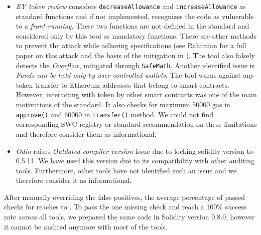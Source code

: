 \begin{itemize}[noitemsep,topsep=0pt]
	\item \textit{EY token review} considers \texttt{decreaseAllowance} and \texttt{increaseAllowance} as standard \erc functions and if not implemented, recognizes the code as vulnerable to a \textit{front-running}. These two functions are not defined in the \erc standard\cite{ERC20Std} and considered only by this tool as mandatory functions. There are other methods to prevent the attack while adhering \erc specifications (see Rahimian \etal for a full paper on this attack and the basis of the mitigation in \sys\cite{ERC20MWA}). The tool also falsely detects the \textit{Overflow}, mitigated through \texttt{SafeMath}. Another identified issue is \textit{Funds can be held only by user-controlled wallets}. The tool warns against any token transfer to Ethereum addresses that belong to smart contracts. However, interacting with \erc token by other smart contracts was one of the main motivations of the standard. It also checks for maximum 50000 gas in \texttt{approve()} and 60000 in \texttt{transfer()} method. We could not find corresponding SWC registry or standard recommendation on these limitations and therefore consider them as informational.

	\item \textit{Odin} raises \textit{Outdated compiler version} issue due to locking solidity version to 0.5.11. We have used this version due to its compatibility with other auditing tools. Furthermore, other tools have not identified such an issue and we therefore consider it as informational.
\end{itemize}

After manually overriding the false positives, the average percentage of passed checks for \sys reaches to \prct. To pass the one missing check and reach a 100\% success rate across all tools, we prepared the same code in Solidity version 0.8.0, however it cannot be audited anymore with most of the tools. 

